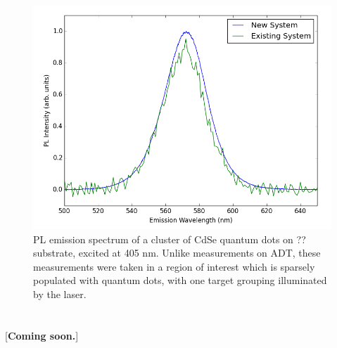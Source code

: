 \begin{figure}[h]
    \centering
    \includegraphics[width=\textwidth]{./img/qd-2.png}
    \caption[PL emission spectrum of a cluster of CdSe quantum dots on ?? substrate, excited at 405 nm.]{PL emission spectrum of a cluster of CdSe quantum dots on ?? substrate, excited at 405 nm. Unlike measurements on ADT, these measurements were taken in a region of interest which is sparsely populated with quantum dots, with one target grouping illuminated by the laser.}
    \label{fig:pl-adt-qd}
\end{figure}

\section{}

[\textbf{Coming soon.}]